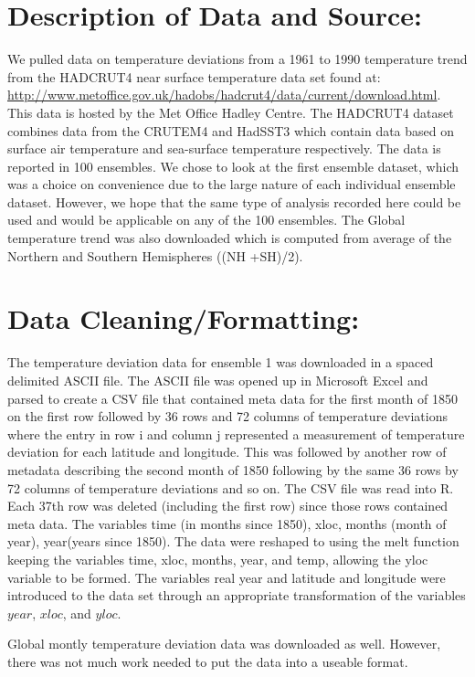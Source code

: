 \documentclass{article}\usepackage{graphicx, color}
\begin{document}
\section{Description of Data and Source:}
We pulled data on temperature deviations from a 1961 to 1990 temperature trend from the HADCRUT4 near surface temperature data set found at: \url{http://www.metoffice.gov.uk/hadobs/hadcrut4/data/current/download.html}.\\ This data is hosted by the Met Office Hadley Centre. The HADCRUT4 dataset combines data from the  CRUTEM4 and HadSST3 which contain data based on surface air temperature and sea-surface temperature respectively. The data is reported in 100 ensembles. We chose to look at the first ensemble dataset, which was a choice on convenience due to the large nature of each individual ensemble dataset. However, we hope that the same type of analysis recorded here could be used and would be applicable on any of the 100 ensembles.  The Global temperature trend was also downloaded which is computed from average of the Northern and Southern Hemispheres ((NH +SH)/2).

\section{Data Cleaning/Formatting:}
The temperature deviation data for ensemble 1 was downloaded in a spaced delimited ASCII file.  The ASCII file was opened up in Microsoft Excel and parsed to create a CSV file that contained meta data for the first month of 1850 on the first row followed by 36 rows and 72 columns of temperature deviations where the entry in row i and column j represented a measurement of temperature deviation for each latitude and longitude. This was followed by another row of metadata describing the second month of 1850 following by the same 36 rows by 72 columns of temperature deviations and so on. The CSV file was read into R. Each 37th row was deleted (including the first row) since those rows contained meta data. The variables time (in months since 1850), xloc, months (month of year), year(years since 1850). The data were reshaped to using the melt function keeping the variables time, xloc, months, year, and temp, allowing the yloc variable to be formed.  The variables real year and latitude and longitude were introduced to the data set through an appropriate transformation of the variables $year$, $xloc$, and $yloc$.

Global montly temperature deviation data was downloaded as well. However, there was not much work needed to put the data into a useable format.
\end{document}
